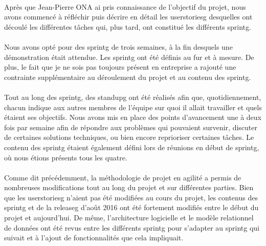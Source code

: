 \documentclass[12pt,a4paper]{report}
\begin{document}
\paragraph*{}Après que Jean-Pierre ONA ai pris connaissance de l’objectif du projet, nous avons commencé à réfléchir puis décrire en détail les \gls{userstoriesg} desquelles ont découlé les différentes tâches qui, plus tard, ont constitué les différents \gls{sprintg}.
\paragraph*{}Nous avons opté pour des \gls{sprintg} de trois semaines, à la fin desquels une démonstration était attendue. Les \gls{sprintg} ont été définis au fur et à mesure. De plus, le fait que je ne sois pas toujours présent en entreprise a rajouté une contrainte supplémentaire au déroulement du projet et au contenu des \gls{sprintg}.
\paragraph*{}Tout au long des \gls{sprintg}, des \gls{standupg} ont été réalisés afin que, quotidiennement, chacun indique aux autres membres de l’équipe sur quoi il allait travailler et quels étaient ses objectifs. Nous avons mis en place des points d’avancement une à deux fois par semaine afin de répondre aux problèmes qui pouvaient survenir, discuter de certaines solutions techniques, ou bien encore reprioriser certaines tâches. Le contenu des \gls{sprintg} étaient également défini lors de réunions en début de \gls{sprintg}, où nous étions présents tous les quatre.
\paragraph*{}Comme dit précédemment, la méthodologie de projet en agilité a permis de nombreuses modifications tout au long du projet et sur différentes parties. Bien que les \gls{userstoriesg} n’aient pas été modifiées au cours du projet, les contenus des \gls{sprintg} et de la \gls{releaseg} d’août 2016 ont été fortement modifiés entre le début du projet et aujourd’hui. De même, l’architecture logicielle et le modèle relationnel de données ont été revus entre les différents \gls{sprintg} pour s’adapter au \gls{sprintg} qui suivait et à l’ajout de fonctionnalités que cela impliquait.
\end{document}

